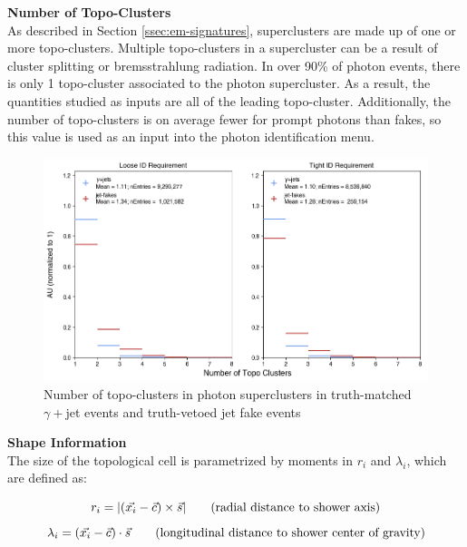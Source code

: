 \noindent\textbf{Number of Topo-Clusters}\\
\indent As described in Section \ref{ssec:em-signatures}, superclusters are made up of one or more topo-clusters. Multiple topo-clusters in a supercluster can be a result of cluster splitting or bremsstrahlung radiation. In over 90\% of photon events, there is only 1 topo-cluster associated to the photon supercluster. As a result, the quantities studied as inputs are all of the leading topo-cluster. Additionally, the number of topo-clusters is on average fewer for prompt photons than fakes, so this value is used as an input into the photon identification menu.


\begin{figure}[htb]
    \centering
    \includegraphics[width=\textwidth]{chapters/chapter4_photonID/images/hists/y_nTopoClusters.png}
    \caption[Number of topo-clusters in photon superclusters]
    {Number of topo-clusters in photon superclusters in truth-matched $\gamma+$jet events and truth-vetoed jet fake events} 
    \label{fig:topo-geom}
\end{figure}


\noindent\textbf{Shape Information}\\
\indent The size of the topological cell is parametrized by moments in $r_i$ and $\lambda_i$, which are defined as:

\begin{equation}
    r_i = |(\vec{x_i} - \vec{c}) \times \vec{s}| \text{\hspace{2em}(radial distance to shower axis)} \\
\end{equation}
\begin{equation}
    \lambda_i = (\vec{x_i} - \vec{c}) \cdot \vec{s} \text{\hspace{2em}(longitudinal distance to shower center of gravity)} 
\end{equation}

